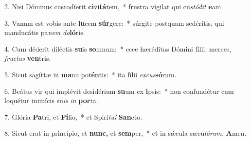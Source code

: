 \item 2. Nisi Dóminus custodíerit \textbf{ci}vi\textbf{tá}tem,~* frustra vígilat qui cu\hspace{0.03em}\textit{stódit} \textbf{e}am.
\item 3. Vanum est vobis ante \textbf{lu}cem \textbf{súr}gere:~* súrgite postquam sedéritis, qui manducátis pa\hspace{0.03em}\textit{nem} \textit{do}\textbf{ló}ris.
\item 4. Cum déderit diléctis \textbf{su}is \textbf{so}mnum:~* ecce hæréditas Dómini fílii: merces, \textit{fru\-ctus} \textbf{ven}tris.
\item 5. Sicut sagíttæ in \textbf{ma}nu pot\textbf{én}tis:~* ita fílii \textit{excus}\textbf{só}rum.
\item 6. Beátus vir qui implévit desidérium \textbf{su}um ex \textbf{i}psis:~* non confundétur cum loquétur inimícis su\hspace{0.03em}\textit{is} \textit{in} \textbf{por}ta.
\item 7. Glória \textbf{Pa}tri, et \textbf{Fí}lio,~* et Spirí\hspace{0.03em}\textit{tu}\textit{i} \textbf{San}cto.
\item 8. Sicut erat in princípio, et \textbf{nunc,} et \textbf{sem}per,~* et in sǽcula sæcu\hspace{0.03em}\textit{lórum.} \textbf{A}men.
